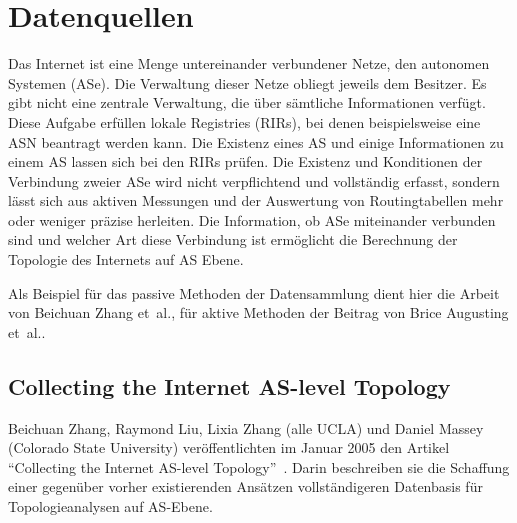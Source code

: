 \section{Datenquellen}\label{sec:datenquellen}

Das Internet ist eine Menge untereinander verbundener Netze, den autonomen Systemen (ASe).
Die Verwaltung dieser Netze obliegt jeweils dem Besitzer. Es gibt nicht eine zentrale Verwaltung, die über sämtliche Informationen verfügt.
Diese Aufgabe erfüllen lokale Registries (RIRs), bei denen beispielsweise eine ASN beantragt werden kann.
Die Existenz eines AS und einige Informationen zu einem AS lassen sich bei den RIRs prüfen.
Die Existenz und Konditionen der Verbindung zweier ASe wird nicht verpflichtend und vollständig erfasst, sondern lässt sich aus aktiven Messungen und der Auswertung von Routingtabellen mehr oder weniger präzise herleiten.
Die Information, ob ASe miteinander verbunden sind und welcher Art diese Verbindung ist ermöglicht die Berechnung der Topologie des Internets auf AS Ebene.

Als Beispiel für das passive Methoden der Datensammlung dient hier die Arbeit von Beichuan Zhang et\ al., für aktive Methoden der Beitrag von Brice Augusting et\ al..

\subsection{Collecting the Internet AS-level Topology}\label{subsec:collecting}

Beichuan Zhang, Raymond Liu, Lixia Zhang (alle UCLA) und Daniel Massey (Colorado State University) veröffentlichten im Januar 2005 den Artikel "`Collecting the Internet AS-level Topology"'~\cite{Zhang:2005:CIA:1052812.1052825}.
Darin beschreiben sie die Schaffung einer gegenüber vorher existierenden Ansätzen vollständigeren Datenbasis für Topologieanalysen auf AS-Ebene.

